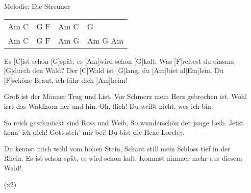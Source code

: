 Melodie: Die Streuner


\begin{guitar}
	
	{\footnotesize\begin{tabular}{l|l|l|l}
		Am C & G F & Am C & G \\
		Am C & G F & Am G & Am G Am
	\end{tabular}}
	
	Es [C]ist schon [G]spät, es [Am]wird schon [G]kalt.
	Was [F]reitest du einsam [G]durch den Wald?
	Der [C]Wald ist [G]lang, du [Am]bist al[Em]lein.
	Du [F]schöne Braut, ich führ dich [Am]heim!
	
	
	Groß ist der Männer Trug und List.
	Vor Schmerz mein Herz gebrochen ist.
	Wohl irrt das Waldhorn her und hin.
	Oh, flieh! Du weißt nicht, wer ich bin.
	
	
	So reich geschmückt sind Ross und Weib,
	So wunderschön der junge Leib.
	Jetzt kenn' ich dich! Gott steh' mir bei!
	Du bist die Hexe Loreley.
	
	
	Du kennst mich wohl vom hohen Stein,
	Schaut still mein Schloss tief in der Rhein.
	Es ist schon spät, es wird schon kalt.
	Kommst nimmer mehr aus diesem Wald!
	
	 (x2)
\end{guitar}